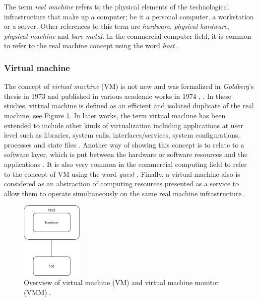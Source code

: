 	The term \textit{real machine} refers to the physical elements of the technological infrastructure that make up a computer; be it a personal computer, a workstation or a server. 
	Other references to this term are \textit {hardware}, \textit {physical hardware}, \textit {physical machine} and \textit{bare-metal}. 
	In the commercial computer field, it is common to refer to the real machine concept using the word \textit{host} \cite{VMware2008}.
	
	\subsubsection{Virtual machine}
	
	The concept of \textit{virtual machine} (VM) is not new and was formalized in \textit{Goldberg}'s thesis in 1973 \cite {Goldberg1973} and published in various academic works in 1974 \cite{Popek1974}, \cite{Goldberg1974}. In these studies, virtual machine is defined as an efficient and isolated duplicate of the real machine, see Figure \ref{fig:TheVirtualMachineMonitor_Popek1974}. In later works, the term virtual machine has been extended to include other kinds of virtualization including applications at user level such as libraries, system calls, interfaces/services, system configurations, processes and state files \cite{Chiueh2005}. Another way of showing this concept is to relate to a software layer, which is put between the hardware or software resources and the applications \cite{Solis2014}. It is also very common in the commercial computing field to refer to the concept of VM using the word \textit{guest} \cite{VMware2008}. Finally, a virtual machine also is considered as an abstraction of computing resources presented as a service to allow them to operate simultaneously on the same real machine infrastructure \cite{Pek2013}.


	\begin{figure}[H]
		\centering
		\includegraphics[width=3cm]{images/TheVirtualMachineMonitor_Popek1974.pdf}
		\vspace{0.2mm}
		\caption{Overview of virtual machine (VM) and virtual machine monitor (VMM) \cite{Popek1974}. }
		\label{fig:TheVirtualMachineMonitor_Popek1974}
	\end{figure}
	
